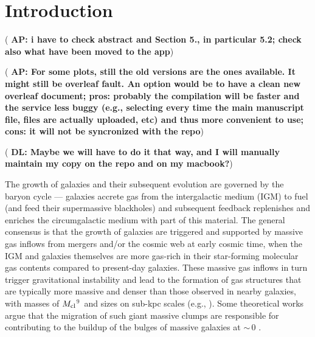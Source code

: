 \IfFileExists{emulateapjlegacy.cls}{\documentclass[iop]{emulateapjlegacy}}{\documentclass[iop]{emulateapj}}
\newcommand{\AP}[1]{({\bf \color{apcolor} AP: #1})}
\newcommand{\DL}[1]{({\bf \color{dlcolor} DL: #1})}
\begin{document}

\section{Introduction}

\AP{i have to check abstract and Section 5., in particular 5.2; check also what have been moved to the app}

\AP{For some plots, still the old versions are the ones available. It might still be overleaf fault. An option would be to have a clean new overleaf document; pros: probably the compilation will be faster and the service less buggy (e.g., selecting every time the main manuscript file, files are actually uploaded, etc) and thus more convenient to use; cons: it will not be syncronized with the repo}

\DL{Maybe we will have to do it that way, and I will manually maintain my copy on the repo and on my macbook?}

The growth of galaxies and their subsequent evolution are governed by the baryon cycle --- galaxies accrete gas from the intergalactic medium (IGM) to fuel \SF (and feed their supermassive blackholes) and subsequent feedback replenishes and enriches the circumgalactic medium with part of this material. The general consensus is that the growth of \highz galaxies are triggered and supported by massive gas inflows from mergers and/or the cosmic web at early cosmic time, when the IGM and galaxies themselves are more gas-rich in their star-forming molecular gas contents compared to present-day galaxies.
%
These massive gas inflows in turn trigger gravitational instability and lead
to the formation of gas structures that are typically more massive and denser than those
observed in nearby galaxies, with masses of $M_{\rm cl}$$^9$\,\Msun
and sizes on sub-kpc scales (e.g., \citealt{Gabor13a, Hopkins14a, Inoue16a}).
Some theoretical works argue that the
migration of such giant massive clumps are responsible for contributing to the
buildup of the bulges of massive galaxies at \z$\sim$\,0 \citep[e.g.,][]{Ceverino10a}.
\end{document}

